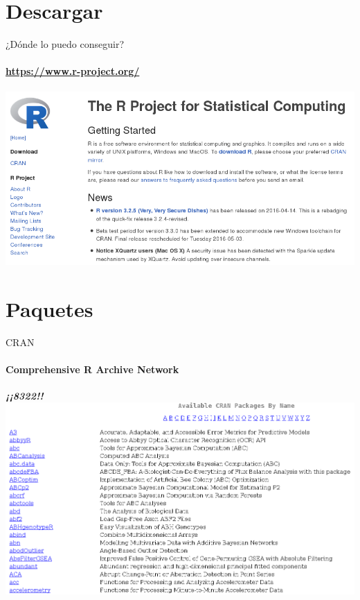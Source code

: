 \documentclass[12pt]{beamer}
\begin{document}
\section{Descargar}
\begin{frame}{¿Dónde lo puedo conseguir?}
\framesubtitle{\url{https://www.r-project.org/}}
\begin{center}
\href{https://www.r-project.org/}{\includegraphics[scale=0.44]{images/image2}}
\end{center}
\end{frame}
\section{Paquetes}
\begin{frame}{CRAN}
\framesubtitle{Comprehensive R Archive Network}
\begin{center}
\textbf{\emph{¡¡8322!!}}
\
\
\href{https://cran.r-project.org/web/packages/available_packages_by_name.html}{\includegraphics[scale=0.3]{images/image3}}
\end{center}
\end{frame}
\end{document}
